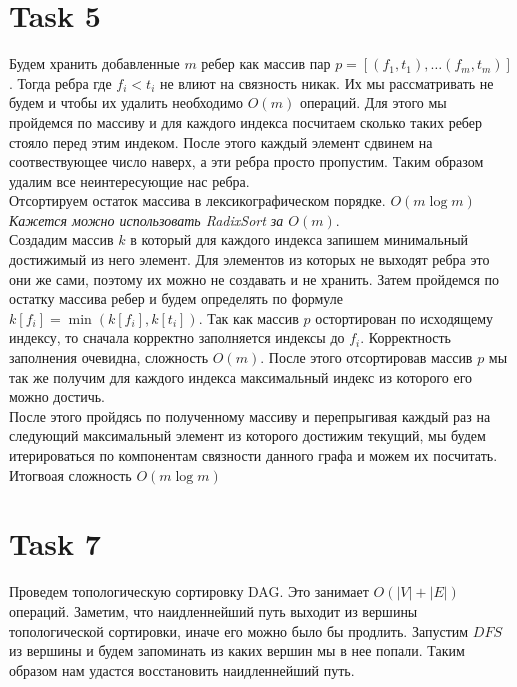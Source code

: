 \documentclass[12pt]{exam}
\begin{document}
\section*{Task 5}
Будем хранить добавленные $m$ ребер как массив пар $p = [(f_1, t_1), \ldots (f_m, t_m)]$.
Тогда ребра где $f_i < t_i$ не влиют на связность никак.
Их мы рассматривать не будем и чтобы их удалить необходимо $O(m)$ операций.
Для этого мы пройдемся по массиву и для каждого индекса посчитаем сколько таких ребер стояло перед этим индеком.
После этого каждый элемент сдвинем на соотвествующее число наверх, а эти ребра просто пропустим.
Таким образом удалим все неинтересующие нас ребра.\\
Отсортируем остаток массива в лексикографическом порядке.
$O(m \log m)$ \textit{Кажется можно использовать RadixSort за $O(m)$}.\\
Создадим массив $k$ в который для каждого индекса запишем минимальный достижимый из него элемент.
Для элементов из которых не выходят ребра это они же сами, поэтому их можно не создавать и не хранить. 
Затем пройдемся по остатку массива ребер и будем определять по формуле 
$k[f_i] = \min(k[f_i], k[t_i])$. 
Так как массив $p$ остортирован по исходящему индексу, 
то сначала корректно заполняется индексы до $f_i$. Корректность заполнения очевидна, сложность $O(m)$.
После этого отсортировав массив $p$ мы так же получим для каждого индекса максимальный индекс из которого его можно достичь.\\
После этого пройдясь по полученному массиву и перепрыгивая каждый раз на следующий максимальный элемент из которого достижим текущий, 
мы будем итерироваться по компонентам связности данного графа и можем их посчитать. 
Итогвоая сложность $O(m \log m)$

\section*{Task 7}
Проведем топологическую сортировку DAG.
Это занимает $O(|V| + |E|)$ операций. 
Заметим, что наидленнейший путь выходит из вершины 
топологической сортировки, иначе его можно было бы продлить. 
Запустим $DFS$ из вершины и будем запоминать из каких вершин мы в нее попали.
Таким образом нам удастся восстановить наидленнейший путь.
\end{document}

